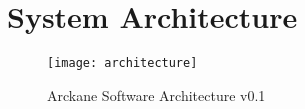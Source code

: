 
\section{System Architecture}\label{system_architecture}

\begin{figure}[h] %
    \centering
    \texttt{[image: architecture]}
    \caption{Arckane Software Architecture v0.1}
    \label{fig:architecture}
\end{figure}